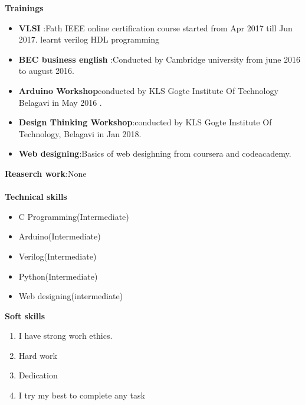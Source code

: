 \documentclass{article}
\begin{document}
\textbf{Trainings}\\[0.1cm]
\begin{itemize}
\item\textbf{ VLSI }:Fath
IEEE online certification course started from  Apr 2017 till Jun 2017.
learnt verilog HDL programming
\item\textbf{BEC business english }:Conducted by Cambridge university from june 2016 to august 2016.
\item\textbf{Arduino Workshop}conducted by KLS Gogte Institute Of Technology Belagavi in 
May 2016 .
\item\textbf{Design Thinking Workshop}:conducted by KLS Gogte Institute Of Technology, Belagavi in Jan 2018.
\item\textbf{Web designing}:Basics of web desighning from coursera and codeacademy. \\
\end{itemize}
\textbf{Reaserch work}:None\\~\\
\textbf{Technical skills}\\
\begin{itemize}
\item C Programming(Intermediate)
\item Arduino(Intermediate)
\item Verilog(Intermediate)
\item Python(Intermediate)
\item Web designing(intermediate)\\

\end{itemize}
\textbf{Soft skills} \\
\begin{enumerate}
\item I have strong worh ethics.
\item Hard work
\item Dedication
\item I try my best to complete any  task\\

\end{enumerate}
\end{document}
